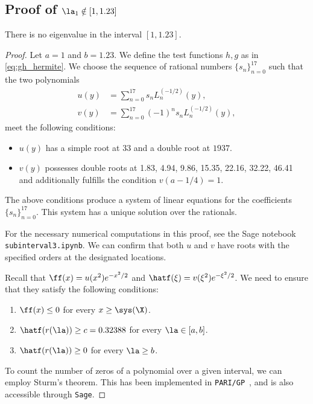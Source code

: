 \subsection{Proof of $\la_1\notin [1,1.23]$}
\label{subsec:subinterval3}
\begin{prop}\label{prop:subinterval3}
There is no eigenvalue in the interval $[1,1.23]$.
\end{prop}

\begin{proof}
Let $a = 1$ and $b=1.23$.
We define the test functions $h,g$ as in \eqref{eq:gh_hermite}.
We choose the sequence of rational numbers \(\{s_n\}_{n=0}^{17}\) such that the two polynomials
\begin{align*}
u(y) &= \sum_{n=0}^{17} s_n L_n^{(-1/2)}(y),\\
v(y) &= \sum_{n=0}^{17} (-1)^n s_n L_n^{(-1/2)}(y),
\end{align*}
meet the following conditions:
\begin{itemize}
    \item \(u(y)\) has a simple root at \(33\) and a double root at \(1937\).
    \item \(v(y)\) possesses double roots at 1.83, 4.94, 9.86, 15.35, 22.16, 32.22, 46.41 and additionally fulfills the condition \(v(a-1/4) = 1\).
\end{itemize}
The above conditions produce a system of linear equations for the coefficients \(\{s_n\}_{n=0}^{17}\).
This system has a unique solution over the rationals.

For the necessary numerical computations in this proof, see the Sage notebook \texttt{subinterval3.ipynb}.
We can confirm that both $u$ and $v$ have roots with the specified orders at the designated locations.

Recall that $\ff(x) = u(x^2) e^{-x^2/2}$ and $\hatf(\xi)=v(\xi^2) e^{-\xi^2/2}$.
We need to ensure that they satisfy the following conditions:
\begin{enumerate}
    \item $\ff(x)\leq 0$ for every $x \geq \sys(\X)$.
    \item $\hatf(r(\la))\geq c=0.32388$ for every $\la \in [a, b]$.
    \item $\hatf(r(\la))\geq 0$ for every $\la \geq b$.
\end{enumerate}
To count the number of zeros of a polynomial over a given interval, we can employ Sturm's theorem.
This has been implemented in \texttt{PARI/GP}~\cite{PARI2}, and is also accessible through \texttt{Sage}.


\end{proof}
